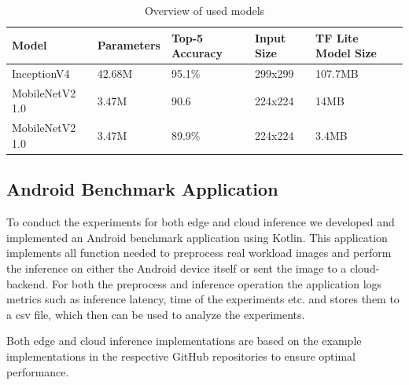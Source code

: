 \begin{table}[]
\caption{Overview of used models}
\label{table:modelOverview}
\begin{tabular}{@{}lllll@{}}
\toprule
Model & Parameters & Top-5 Accuracy\cite{modelspecs} & Input Size & TF Lite Model Size \\
\midrule
InceptionV4 & 42.68M & 95.1\% & 299x299 & 107.7MB \\
MobileNetV2 1.0 & 3.47M\cite{DBLP:journals/corr/abs-1801-04381} & 90.6 & 224x224 & 14MB \\
MobileNetV2 1.0 & 3.47M\cite{DBLP:journals/corr/abs-1801-04381} & 89.9\% & 224x224 & 3.4MB\\
\bottomrule
\end{tabular}
\end{table}


\subsection{Android Benchmark Application}
To conduct the experiments for both edge and cloud inference we developed and implemented an Android benchmark application using Kotlin.
This application implements all function needed to preprocess real workload images and perform the inference on either the Android device itself or sent the image to a cloud-backend.
For both the preprocess and inference operation the application logs metrics such as inference latency, time of the experiments etc. and stores them to a csv file, which then can be used to analyze the experiments.

Both edge and cloud inference implementations are based on the example implementations in the respective GitHub repositories to ensure optimal performance. 

